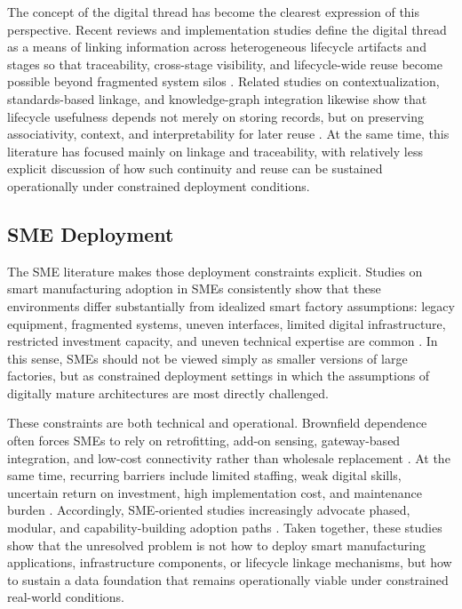 \documentclass[systems,article,submit,pdftex,moreauthors]{Definitions/mdpi}
\begin{document}
The concept of the digital thread has become the clearest expression of this perspective. Recent reviews and implementation studies define the digital thread as a means of linking information across heterogeneous lifecycle artifacts and stages so that traceability, cross-stage visibility, and lifecycle-wide reuse become possible beyond fragmented system silos \cite{abdelaty2024conceptualizing, zhang2024digitalthread, bianchini2024digitalthread, hedberg2020graphs}. Related studies on contextualization, standards-based linkage, and knowledge-graph integration likewise show that lifecycle usefulness depends not merely on storing records, but on preserving associativity, context, and interpretability for later reuse \cite{kwon2020enriching, schmidt2018flow, monnier2022methodology}. At the same time, this literature has focused mainly on linkage and traceability, with relatively less explicit discussion of how such continuity and reuse can be sustained operationally under constrained deployment conditions.

\subsection{SME Deployment}
\label{sec:sme_deployment}

The SME literature makes those deployment constraints explicit. Studies on smart manufacturing adoption in SMEs consistently show that these environments differ substantially from idealized smart factory assumptions: legacy equipment, fragmented systems, uneven interfaces, limited digital infrastructure, restricted investment capacity, and uneven technical expertise are common \cite{mittal2018maturity, mittal2020adoption, ghobakhloo2019adoption, krishnan2024challenges}. In this sense, SMEs should not be viewed simply as smaller versions of large factories, but as constrained deployment settings in which the assumptions of digitally mature architectures are most directly challenged.

These constraints are both technical and operational. Brownfield dependence often forces SMEs to rely on retrofitting, add-on sensing, gateway-based integration, and low-cost connectivity rather than wholesale replacement \cite{alqoud2022legacy, etz2020retrofit, tran2022retrofitting, park2019opcua}. At the same time, recurring barriers include limited staffing, weak digital skills, uncertain return on investment, high implementation cost, and maintenance burden \cite{huang2025barriers, narwane2022examining, kumar2025digitalization, hulla2021towards}. Accordingly, SME-oriented studies increasingly advocate phased, modular, and capability-building adoption paths \cite{chavez2020capability, krishnan2024challenges, banerjee2024lowcost}. Taken together, these studies show that the unresolved problem is not how to deploy smart manufacturing applications, infrastructure components, or lifecycle linkage mechanisms, but how to sustain a data foundation that remains operationally viable under constrained real-world conditions.
\end{document}
